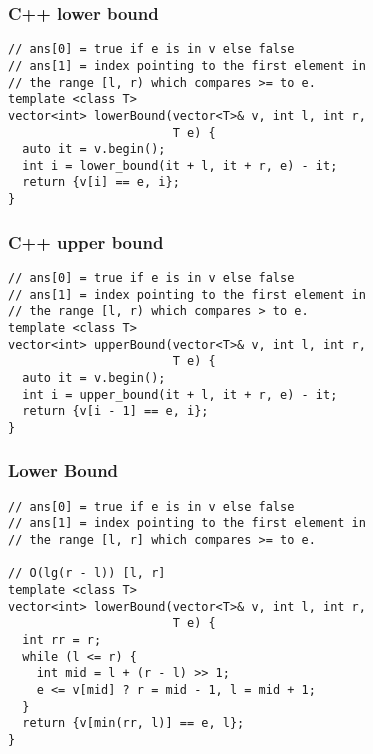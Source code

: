 \documentclass[twoside]{article}
\newcommand{\fileTitleStyle}{\large\underline}
\begin{document}
\begin{multicols*}{2}
\subsubsectionfont{\centering\bfseries\Large}
\subsubsectionfont{\fileTitleStyle}
\subsubsection*{C++ lower bound}
\begin{verbatim}
// ans[0] = true if e is in v else false
// ans[1] = index pointing to the first element in
// the range [l, r) which compares >= to e.
template <class T>
vector<int> lowerBound(vector<T>& v, int l, int r,
                       T e) {
  auto it = v.begin();
  int i = lower_bound(it + l, it + r, e) - it;
  return {v[i] == e, i};
}
\end{verbatim}

\subsubsectionfont{\centering\bfseries\Large}
\subsubsectionfont{\fileTitleStyle}
\subsubsection*{C++ upper bound}
\begin{verbatim}
// ans[0] = true if e is in v else false
// ans[1] = index pointing to the first element in
// the range [l, r) which compares > to e.
template <class T>
vector<int> upperBound(vector<T>& v, int l, int r,
                       T e) {
  auto it = v.begin();
  int i = upper_bound(it + l, it + r, e) - it;
  return {v[i - 1] == e, i};
}
\end{verbatim}

\subsubsectionfont{\centering\bfseries\Large}
\subsubsectionfont{\fileTitleStyle}
\subsubsection*{Lower Bound}
\begin{verbatim}
// ans[0] = true if e is in v else false
// ans[1] = index pointing to the first element in
// the range [l, r] which compares >= to e.

// O(lg(r - l)) [l, r]
template <class T>
vector<int> lowerBound(vector<T>& v, int l, int r,
                       T e) {
  int rr = r;
  while (l <= r) {
    int mid = l + (r - l) >> 1;
    e <= v[mid] ? r = mid - 1, l = mid + 1;
  }
  return {v[min(rr, l)] == e, l};
}
\end{verbatim}


\end{multicols*}
\end{document}
